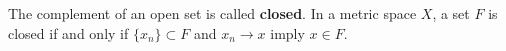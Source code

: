 The complement of an open set is called \textbf{closed}. In a metric space $X$, a set $F$ is closed if and only if $\{x_n\} \subset F$ and $x_n \to x$ imply $x \in F$.
